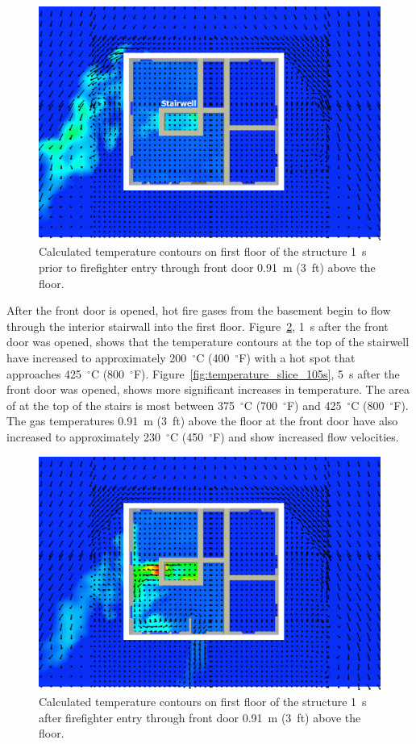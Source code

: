 \documentclass[12pt,oneside]{book}
\begin{document}
\begin{figure}[!ht]
\includegraphics[trim = 1in 1in 1in 1in, clip=true, width=.65\textwidth]{../Figures/temperature_slice_99s}


\caption[Calculated temperature on first floor 1~s before front door opened]
{Calculated temperature contours on first floor of the structure 1~s prior to firefighter entry through front door 0.91~m (3~ft) above the floor.}
\label{fig:temperature_slice_99s}
\end{figure}

After the front door is opened, hot fire gases from the basement begin to flow through the interior stairwall into the first floor. Figure~\ref{fig:temperature_slice_101s}, 1~s after the front door was opened, shows that the temperature contours at the top of the stairwell have increased to approximately 200~$^{\circ}$C (400~$^{\circ}$F) with a hot spot that approaches 425~$^{\circ}$C (800~$^{\circ}$F). Figure~\ref{fig:temperature_slice_105s}, 5~s after the front door was opened, shows more significant increases in temperature. The area of at the top of the stairs is most between 375~$^{\circ}$C (700~$^{\circ}$F) and 425~$^{\circ}$C (800~$^{\circ}$F). The gas temperatures 0.91~m (3~ft) above the floor at the front door have also increased to approximately 230~$^{\circ}$C (450~$^{\circ}$F) and show increased flow velocities.

\begin{figure}[!ht]
\includegraphics[trim = 1in 1in 1in 1in, clip=true, width=.65\textwidth]{../Figures/temperature_slice_101s}


\caption[Calculated temperature on first floor 1~s after front door opens]
{Calculated temperature contours on first floor of the structure 1~s after firefighter entry through front door 0.91~m (3~ft) above the floor.}
\label{fig:temperature_slice_101s}
\end{figure}
\end{document}
